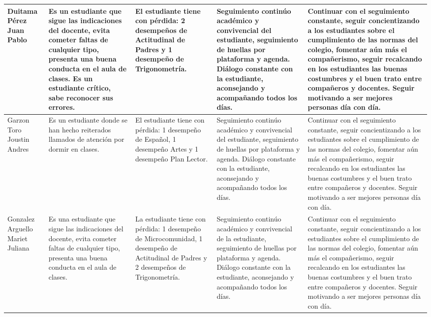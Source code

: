 \documentclass[spanish,11pt,a4paper]{article}
\begin{document}
\begin{longtable}{|p{3.5cm}|p{3.5cm}|p{3.5cm}|p{3.5cm}|p{3.5cm}|}
		Duitama Pérez Juan Pablo & 
		Es un estudiante que sigue las indicaciones del docente, evita cometer faltas de cualquier tipo, presenta una buena conducta en el aula de clases. Es un estudiante crítico, sabe reconocer sus errores. & 
		El estudiante tiene con pérdida: 2 desempeños de Actitudinal de Padres y 1 desempeño de Trigonometría. & 
		Seguimiento continúo académico y convivencial del estudiante, seguimiento de huellas por plataforma y agenda. Diálogo constante con la estudiante, aconsejando y acompañando todos los días. & 
		Continuar con el seguimiento constante, seguir concientizando a los estudiantes sobre el cumplimiento de las normas del colegio, fomentar aún más el compañerismo, seguir recalcando en los estudiantes las buenas costumbres y el buen trato entre compañeros y docentes. Seguir motivando a ser mejores personas día con día.\\
		\hline
		
		Garzon Toro Joustin Andres & 
		Es un estudiante donde se han hecho reiterados llamados de atención por dormir en clases. & 
		El estudiante tiene con pérdida: 1 desempeño de Español, 1 desempeño Artes y 1 desempeño Plan Lector.  & 
		Seguimiento continúo académico y convivencial del estudiante, seguimiento de huellas por plataforma y agenda. Diálogo constante con la estudiante, aconsejando y acompañando todos los días. & 
		Continuar con el seguimiento constante, seguir concientizando a los estudiantes sobre el cumplimiento de las normas del colegio, fomentar aún más el compañerismo, seguir recalcando en los estudiantes las buenas costumbres y el buen trato entre compañeros y docentes. Seguir motivando a ser mejores personas día con día.\\
		\hline
		
		Gonzalez Arguello Mariet Juliana & 
		Es una estudiante que sigue las indicaciones del docente, evita cometer faltas de cualquier tipo, presenta una buena conducta en el aula de clases. & 
		La estudiante tiene con pérdida: 1 desempeño de Microcomunidad, 1 desempeño de Actitudinal de Padres y 2 desempeños de Trigonometría. & 
		Seguimiento continúo académico y convivencial de la estudiante, seguimiento de huellas por plataforma y agenda. Diálogo constante con la estudiante, aconsejando y acompañando todos los días. & 
		Continuar con el seguimiento constante, seguir concientizando a los estudiantes sobre el cumplimiento de las normas del colegio, fomentar aún más el compañerismo, seguir recalcando en los estudiantes las buenas costumbres y el buen trato entre compañeros y docentes. Seguir motivando a ser mejores personas día con día.\\
		\hline
		

\end{longtable}
\end{document}
